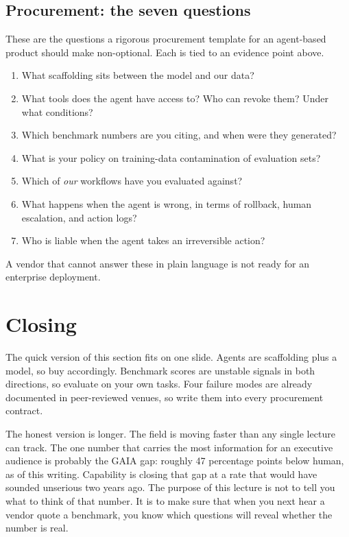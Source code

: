 \documentclass[11pt]{article}
\begin{document}
\subsection*{Procurement: the seven questions}

These are the questions a rigorous procurement template for an
agent-based product should make non-optional. Each is tied to an
evidence point above.

\begin{enumerate}[leftmargin=1.5em]
  \item What scaffolding sits between the model and our data?
  \item What tools does the agent have access to? Who can revoke
    them? Under what conditions?
  \item Which benchmark numbers are you citing, and when were they
    generated?
  \item What is your policy on training-data contamination of
    evaluation sets?
  \item Which of \emph{our} workflows have you evaluated against?
  \item What happens when the agent is wrong, in terms of rollback,
    human escalation, and action logs?
  \item Who is liable when the agent takes an irreversible action?
\end{enumerate}

A vendor that cannot answer these in plain language is not ready for
an enterprise deployment.

\section*{Closing}

The quick version of this section fits on one slide. Agents are
scaffolding plus a model, so buy accordingly. Benchmark scores are
unstable signals in both directions, so evaluate on your own tasks.
Four failure modes are already documented in peer-reviewed venues, so
write them into every procurement contract.

The honest version is longer. The field is moving faster than any
single lecture can track. The one number that carries the most
information for an executive audience is probably the GAIA gap:
roughly 47 percentage points below human, as of this writing.
Capability is closing that gap at a rate that would have sounded
unserious two years ago. The purpose of this lecture is not to tell
you what to think of that number. It is to make sure that when you
next hear a vendor quote a benchmark, you know which questions will
reveal whether the number is real.



\end{document}
